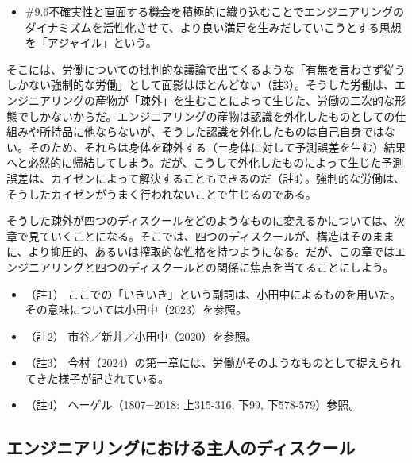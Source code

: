 \begin{note}{}
  \begin{itemize}
    \tightlist
    \item{\#9.6}不確実性と直面する機会を積極的に織り込むことでエンジニアリングのダイナミズムを活性化させて、より良い満足を生みだしていこうとする思想を「アジャイル」という。
  \end{itemize}
\end{note}

そこには、労働についての批判的な議論で出てくるような「有無を言わさず従うしかない強制的な労働」として面影はほとんどない（註3）。そうした労働は、エンジニアリングの産物が「疎外」を生むことによって生じた、労働の二次的な形態でしかないからだ。エンジニアリングの産物は認識を外化したものとしての仕組みや所持品に他ならないが、そうした認識を外化したものは自己自身ではない。そのため、それらは身体を疎外する（＝身体に対して予測誤差を生む）結果へと必然的に帰結してしまう。だが、こうして外化したものによって生じた予測誤差は、カイゼンによって解決することもできるのだ（註4）。強制的な労働は、そうしたカイゼンがうまく行われないことで生じるのである。

そうした疎外が四つのディスクールをどのようなものに変えるかについては、次章で見ていくことになる。そこでは、四つのディスクールが、構造はそのままに、より抑圧的、あるいは搾取的な性格を持つようになる。だが、この章ではエンジニアリングと四つのディスクールとの関係に焦点を当てることにしよう。

\begin{itemize}
\tightlist
\item
  （註1）
  ここでの「いきいき」という副詞は、小田中によるものを用いた。その意味については小田中（2023）\cite{Odanaka}を参照。
\item
  （註2） 市谷／新井／小田中（2020）\cite{IchitaniEtAl}を参照。
\item
  （註3）
  今村（2024）\cite{Imamura2}の第一章には、労働がそのようなものとして捉えられてきた様子が記されている。
\item
  （註4） ヘーゲル（1807=2018: 上315-316, 下99,
  下578-579）\cite{Hegel2}参照。
\end{itemize}

\subsection{エンジニアリングにおける主人のディスクール}\label{ux30a8ux30f3ux30b8ux30cbux30a2ux30eaux30f3ux30b0ux306bux304aux3051ux308bux4e3bux4ebaux306eux30c7ux30a3ux30b9ux30afux30fcux30eb}

